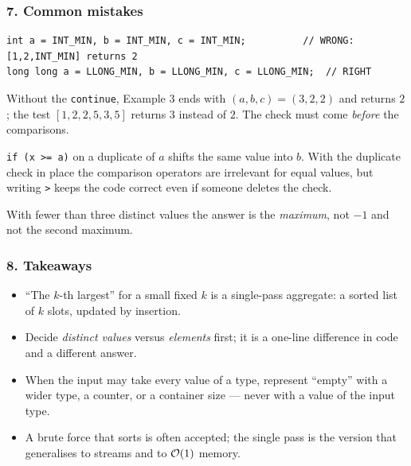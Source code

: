 \subsubsection*{7. Common mistakes}

\begin{warningbox}
\begin{lstlisting}[style=snippet]
int a = INT_MIN, b = INT_MIN, c = INT_MIN;          // WRONG: [1,2,INT_MIN] returns 2
long long a = LLONG_MIN, b = LLONG_MIN, c = LLONG_MIN;  // RIGHT
\end{lstlisting}
\end{warningbox}

\begin{warningbox}
Without the \texttt{continue}, Example 3 ends with $(a,b,c) = (3, 2, 2)$ and returns $2$; the test $[1,2,2,5,3,5]$ returns $3$ instead of $2$. The check must come \emph{before} the comparisons.
\end{warningbox}

\begin{warningbox}[Mistake 3 --- \texttt{>=} instead of \texttt{>}]
\texttt{if (x >= a)} on a duplicate of $a$ shifts the same value into $b$. With the duplicate check in place the comparison operators are irrelevant for equal values, but writing \texttt{>} keeps the code correct even if someone deletes the check.
\end{warningbox}

\begin{warningbox}
With fewer than three distinct values the answer is the \emph{maximum}, not $-1$ and not the second maximum.
\end{warningbox}

\subsubsection*{8. Takeaways}

\begin{itemize}[leftmargin=*]
    \item ``The $k$-th largest'' for a small fixed $k$ is a single-pass aggregate: a sorted list of $k$ slots, updated by insertion.
    \item Decide \emph{distinct values} versus \emph{elements} first; it is a one-line difference in code and a different answer.
    \item When the input may take every value of a type, represent ``empty'' with a wider type, a counter, or a container size --- never with a value of the input type.
    \item A brute force that sorts is often accepted; the single pass is the version that generalises to streams and to $\mathcal{O}(1)$ memory.
\end{itemize}

